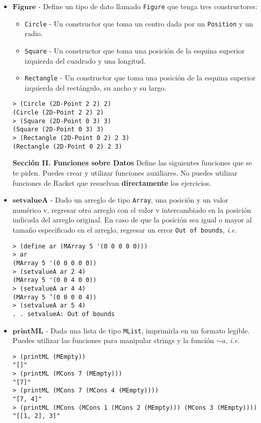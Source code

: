 \documentclass{article}
\begin{document}
\begin{itemize}
\item $\textbf{Figure}$ - Define un tipo de dato llamado
  \texttt{Figure}
  que tenga tres constructores:
  \begin{itemize}
    \item{\texttt{Circle} - Un constructor que toma un centro dada por un
      \texttt{Position} y un radio.}
    \item{\texttt{Square} - Un constructor que toma una posición de la
      esquina superior izquierda del cuadrado y una longitud.}
    \item{\texttt{Rectangle} - Un constructor que toma una posición de
    la esquina superior izquierda del rectángulo, su ancho y su largo.}
  \end{itemize}
\begin{verbatim}
> (Circle (2D-Point 2 2) 2)
(Circle (2D-Point 2 2) 2)
> (Square (2D-Point 0 3) 3)
(Square (2D-Point 0 3) 3)
> (Rectangle (2D-Point 0 2) 2 3)
(Rectangle (2D-Point 0 2) 2 3)
\end{verbatim}


\textbf{Sección II. Funciones sobre Datos} Define
las siguientes funciones que se te piden. Puedes crear y utilizar
funciones auxiliares. No puedes utilizar funciones de Racket que
resuelvan \textbf{directamente} los ejercicios.

\item $\textbf{setvalueA}$ - Dado un arreglo de tipo \texttt{Array},
  una posición y un valor numérico v, regresar otro arreglo con el
  valor v intercambiado en la posición indicada del arreglo original.
  En caso de que la posición sea igual o mayor al tamaño especificado
  en el arreglo, regresar un error \texttt{Out of bounds},
  \textit{i.e.}
\begin{verbatim}
> (define ar (MArray 5 '(0 0 0 0 0)))
> ar
(MArray 5 '(0 0 0 0 0))
> (setvalueA ar 2 4)
(MArray 5 '(0 0 4 0 0))
> (setvalueA ar 4 4)
(MArray 5 ’(0 0 0 0 4))
> (setvalueA ar 5 4)
. . setvalueA: Out of bounds
\end{verbatim}

\item $\textbf{printML}$ - Dada una lista de tipo \texttt{MList},
  imprimirla en un formato legible. Puedes utilizar las funciones para
  manipular strings y la función \texttt{$\sim a$}, \textit{i.e.}
\begin{verbatim}
> (printML (MEmpty))
"[]"
> (printML (MCons 7 (MEmpty)))
"[7]"
> (printML (MCons 7 (MCons 4 (MEmpty))))
"[7, 4]"
> (printML (MCons (MCons 1 (MCons 2 (MEmpty))) (MCons 3 (MEmpty))))
"[[1, 2], 3]"
\end{verbatim}


\end{itemize}
\end{document}
